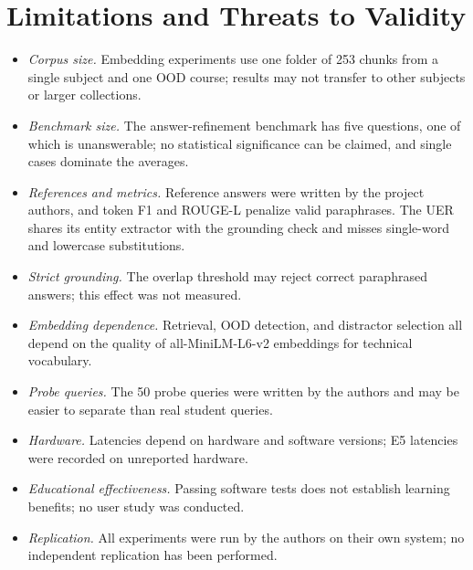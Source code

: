\documentclass[conference]{IEEEtran}
\begin{document}
\section{Limitations and Threats to Validity}
\begin{itemize}
\item \emph{Corpus size.} Embedding experiments use one folder of 253 chunks from a single subject and one OOD course; results may not transfer to other subjects or larger collections.
\item \emph{Benchmark size.} The answer-refinement benchmark has five questions, one of which is unanswerable; no statistical significance can be claimed, and single cases dominate the averages.
\item \emph{References and metrics.} Reference answers were written by the project authors, and token F1 and ROUGE-L penalize valid paraphrases. The UER shares its entity extractor with the grounding check and misses single-word and lowercase substitutions.
\item \emph{Strict grounding.} The overlap threshold may reject correct paraphrased answers; this effect was not measured.
\item \emph{Embedding dependence.} Retrieval, OOD detection, and distractor selection all depend on the quality of all-MiniLM-L6-v2 embeddings for technical vocabulary.
\item \emph{Probe queries.} The 50 probe queries were written by the authors and may be easier to separate than real student queries.
\item \emph{Hardware.} Latencies depend on hardware and software versions; E5 latencies were recorded on unreported hardware.
\item \emph{Educational effectiveness.} Passing software tests does not establish learning benefits; no user study was conducted.
\item \emph{Replication.} All experiments were run by the authors on their own system; no independent replication has been performed.
\end{itemize}
\end{document}
